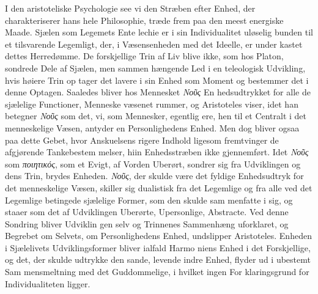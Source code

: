 \documentclass[12pt,a4paper]{book}
\newcommand{\gk}[1]{\textit{#1}}
\begin{document}
I den aristoteliske Psychologie see vi den Stræben efter
Enhed, der charakteriserer hans hele Philosophie, træde frem
paa den meest energiske Maade. Sjælen som Legemets Ente\-%
lechie er i sin Individualitet uløselig bunden til et tilsvarende
Legemligt, der, i Væsensenheden med det Ideelle, er under\-%
kastet dettes Herredømme. De forskjellige Trin af Liv blive
ikke, som hos Platon, sondrede Dele af Sjælen, men sammen\-%
hængende Led i en teleologisk Udvikling, hvis høiere Trin op\-%
tager det lavere i sin Enhed som Moment og bestemmer det
i denne Optagen. Saaledes bliver hos Mennesket \gk{Νοῦς} En\-%
hedsudtrykket for alle de sjælelige Functioner, Menneske\-%
væsenet rummer, og Aristoteles viser, idet han betegner \gk{Νοῦς}
som det, vi, som Mennesker, egentlig ere, hen til et Centralt
i det menneskelige Væsen, antyder en Personlighedens Enhed.
Men dog bliver ogsaa paa dette Gebet, hvor Anskuelsens
rigere Indhold ligesom fremtvinger de afgjørende Tankebestem\-%
melser, hiin Enhedsstræben ikke gjennemført. Idet \gk{Νοῦς} som
\gk{ποιητικός}, som et Evigt, af Vorden Uberørt, sondrer sig fra
Udviklingen og dens Trin, brydes Enheden. \gk{Νοῦς}, der skulde
være det fyldige Enhedsudtryk for det menneskelige Væsen,
skiller sig dualistisk fra det Legemlige og fra alle ved det
Legemlige betingede sjælelige Former, som den skulde sam\-%
menfatte i sig, og staaer som det af Udviklingen Uberørte,
Upersonlige, Abstracte. Ved denne Sondring bliver Udviklin\-%
gen selv og Trinnenes Sammenhæng uforklaret, og Begrebet
om Selvets, om Personlighedens Enhed, undslipper Aristoteles.
Enheden i Sjælelivets Udviklingsformer bliver ialfald Harmo\-%
niens Enhed i det Forskjellige, og det, der skulde udtrykke
den sande, levende indre Enhed, flyder ud i ubestemt Sam\-%
mensmeltning med det Guddommelige, i hvilket ingen For\-%
klaringsgrund for Individualiteten ligger.
\end{document}
